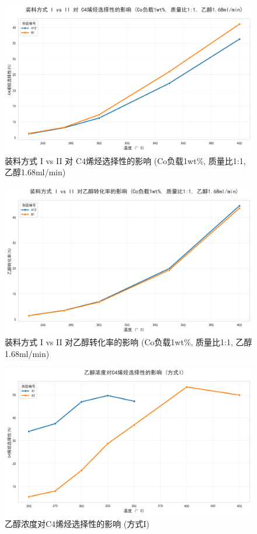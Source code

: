 \begin{figure}[h]%
	\centering%
	\includegraphics [scale=0.6]{图/2-1-1-1.png}
	\caption{装料方式 I vs II 对 C4烯烃选择性的影响 (Co负载1wt\%, 质量比1:1, 乙醇1.68ml/min)} 
	\label{fig:1}
\end{figure}

\begin{figure}[h]%
	\centering%
	\includegraphics [scale=0.6]{图/2-1-1-2.png}
	\caption{装料方式 I vs II 对乙醇转化率的影响 (Co负载1wt\%, 质量比1:1, 乙醇1.68ml/min)} 
	\label{fig:1}
\end{figure}

\begin{figure}[h]%
	\centering%
	\includegraphics [scale=0.6]{图/2-2-1-1.png}
	\caption{乙醇浓度对C4烯烃选择性的影响 (方式I)} 
	\label{fig:1}
\end{figure}

